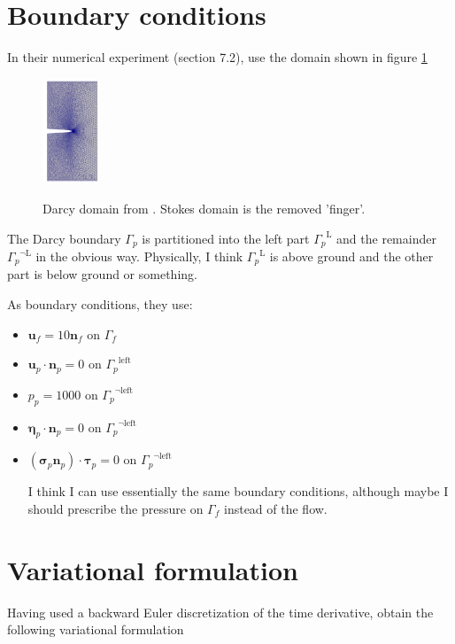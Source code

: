 \documentclass{article}
\newcommand{\mathspace}[1]{\ensuremath{#1}\xspace} %
\newcommand{\sigmabf}{\mathspace{\boldsymbol{\sigma}}}
\newcommand{\taubf}{\mathspace{\boldsymbol{\tau}}}
\newcommand{\stokesbdy}{\mathspace{\Gamma_{f}}}
\newcommand{\darcybdy}{\mathspace{\Gamma_{p}}}
\newcommand{\nf}{\mathspace{\mathbf{n}_f}}
\newcommand{\np}{\mathspace{\mathbf{n}_p}}
\newcommand{\uf}{\mathspace{\mathbf{u}_f}}
\newcommand{\up}{\mathspace{\mathbf{u}_p}}
\newcommand{\pp}{\mathspace{p_p}}
\newcommand{\disp}{\mathspace{\boldsymbol{\eta}_p}}
\begin{document}
\section{Boundary conditions}
In their numerical experiment (section 7.2), \cite{ambartsumyan} use the domain shown in figure \ref{fig:ambartsumyandomain}
\begin{figure}[h]
  \centering
  \includegraphics[width=0.15\textwidth]{img/ambartsumyandomain.png}
  \label{fig:ambartsumyandomain}
  \caption{Darcy domain from \cite{ambartsumyan}. Stokes domain is the removed 'finger'.}
\end{figure}
The Darcy boundary \darcybdy is partitioned into the left part $\darcybdy^{\text{L}}$ and the remainder $\darcybdy^{\neg \text{L}}$ in the obvious way. Physically, I think $\darcybdy^{\text{L}}$ is above ground and the other part is below ground or something.

As boundary conditions, they use:
\begin{itemize}
\item $\uf = 10 \nf$ on \stokesbdy
\item $\up \cdot \np = 0$ on $\darcybdy^{\text{left}}$
\item $\pp = 1000$ on $\darcybdy^{\neg \text{left}}$
\item $\disp \cdot \np = 0$ on $\darcybdy^{\neg \text{left}}$
\item $(\sigmabf_p \np) \cdot \taubf_p = 0$ on $\darcybdy^{\neg \text{left}}$

I think I can use essentially the same boundary conditions, although maybe I should prescribe the pressure on \stokesbdy instead of the flow.
 
\end{itemize}
\section{Variational formulation}
Having used a backward Euler discretization of the time derivative, \cite{ambartsumyan} obtain the following variational formulation
\end{document}
